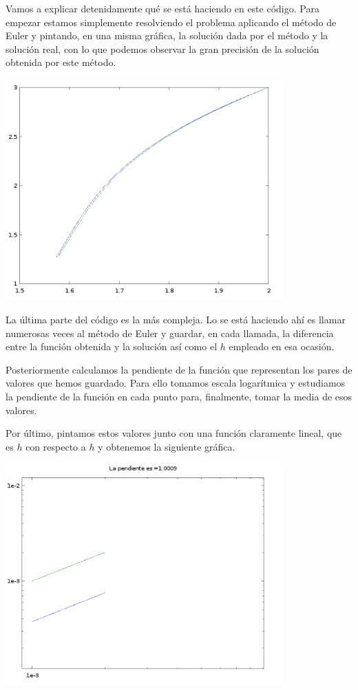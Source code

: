 \documentclass{apuntes}
\begin{document}
Vamos a explicar detenidamente qué se está haciendo en este código. Para empezar estamos simplemente resolviendo el problema aplicando el método de Euler y pintando, en una misma gráfica, la solución dada por el método y la solución real, con lo que podemos observar la gran precisión de la solución obtenida por este método.
\begin{center}
\includegraphics[width=0.8\textwidth]{img/figure1.png}
\end{center}

La última parte del código es la más compleja. Lo se está haciendo ahí es llamar numerosas veces al método de Euler y guardar, en cada llamada, la diferencia entre la función obtenida y la solución así como el $h$ empleado en esa ocasión.

Posteriormente calculamos la pendiente de la función que representan los pares de valores que hemos guardado. Para ello tomamos escala logarítmica y estudiamos la pendiente de la función en cada punto para, finalmente, tomar la media de esos valores.

Por último, pintamos estos valores junto con una función claramente lineal, que es $h$ con respecto a $h$ y obtenemos la siguiente gráfica.

\begin{center}
\includegraphics[width=0.8\textwidth]{img/figure2.png}
\end{center}
\end{document}
